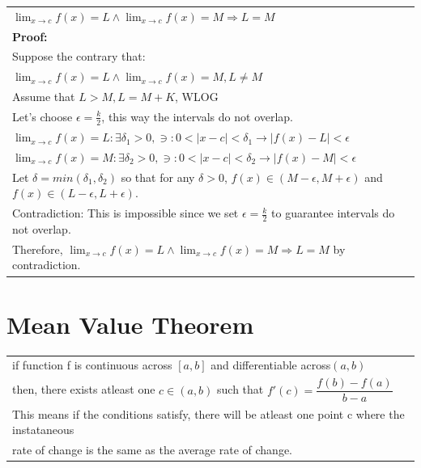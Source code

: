 \documentclass{article}
\begin{document}
\begin{center}
{\renewcommand{\arraystretch}{1.3}
\begin{tabular}{l}
$\displaystyle \lim_{x \to c} f(x) = L \land \lim_{x \to c} f(x) = M \Longrightarrow L = M$\\
\textbf{Proof:}\\
Suppose the contrary that:\\
$\displaystyle \lim_{x \to c} f(x) = L \land \lim_{x \to c} f(x) = M, L \neq M$\\
Assume that $L > M, L = M + K$, WLOG\\
Let's choose $\epsilon = \displaystyle\frac{k}{2}$, this way the intervals do not overlap.\\
$\displaystyle \lim_{x \to c} f(x) = L: \exists \delta_1 > 0, \ni: 0 < |x - c| < \delta_1 \rightarrow |f(x) - L| < \epsilon$\\
$\displaystyle \lim_{x \to c} f(x) = M: \exists \delta_2 > 0, \ni: 0 < |x - c| < \delta_2 \rightarrow |f(x) - M| < \epsilon$\\
Let $\delta = min(\delta_1, \delta_2)$ so that for any $\delta > 0$, $f(x) \in (M - \epsilon, M + \epsilon)$ and $f(x) \in (L - \epsilon, L + \epsilon)$.\\
Contradiction: This is impossible since we set $\epsilon = \displaystyle\frac{k}{2}$ to guarantee intervals do not overlap.\\
Therefore, $\displaystyle \lim_{x \to c} f(x) = L \land \lim_{x \to c} f(x) = M \Longrightarrow L = M$ by contradiction.
\end{tabular}}
\end{center}


\pagebreak

\text{}


\section{Mean Value Theorem}

\begin{tabular}{l}
if function f is continuous across $[a,b]$ and differentiable across$(a,b)$\\
then, there exists atleast one $c \in (a,b)$ such that $f'(c) = \dfrac{f(b) - f(a)}{b - a}$\\
This means if the conditions satisfy, there will be atleast one point c where the instataneous\\
rate of change is the same as the average rate of change.\\
\end{tabular}
\end{document}
